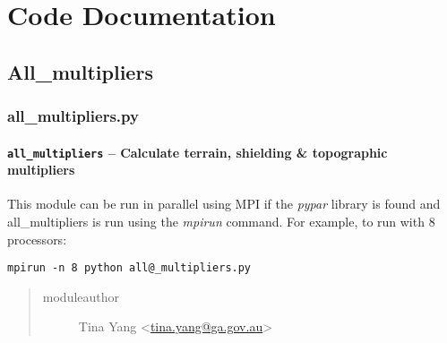 \documentclass[letterpaper,10pt,english]{sphinxmanual}
\begin{document}
\chapter{Code Documentation}
\label{index:code-documentation}

\section{All\_multipliers}
\label{docs/all_multipliers:all-multipliers}\label{docs/all_multipliers::doc}

\subsection{all\_multipliers.py}
\label{docs/all_multipliers:module-all_multipliers}\label{docs/all_multipliers:all-multipliers-py}

\subsubsection{\texttt{all\_multipliers} -- Calculate terrain, shielding \& topographic multipliers}
\label{docs/all_multipliers:all-multipliers-calculate-terrain-shielding-topographic-multipliers}
This module can be run in parallel using MPI if the
\emph{pypar} library is found and all\_multipliers is run using the
\emph{mpirun} command. For example, to run with 8 processors:

\begin{Verbatim}[commandchars=@\[\]]
mpirun -n 8 python all@_multipliers.py
\end{Verbatim}
\begin{quote}\begin{description}
\item[{moduleauthor}] \leavevmode
Tina Yang \textless{}\href{mailto:tina.yang@ga.gov.au}{tina.yang@ga.gov.au}\textgreater{}

\end{description}\end{quote}

\end{document}
